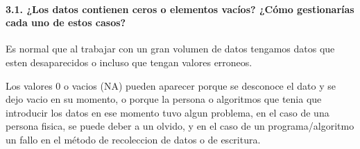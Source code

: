 \documentclass[]{article}
\newenvironment{Shaded}{\begin{snugshade}}{\end{snugshade}}
\newcommand{\DataTypeTok}[1]{\textcolor[rgb]{0.13,0.29,0.53}{#1}}
\newcommand{\DecValTok}[1]{\textcolor[rgb]{0.00,0.00,0.81}{#1}}
\newcommand{\KeywordTok}[1]{\textcolor[rgb]{0.13,0.29,0.53}{\textbf{#1}}}
\newcommand{\NormalTok}[1]{#1}
\newcommand{\OperatorTok}[1]{\textcolor[rgb]{0.81,0.36,0.00}{\textbf{#1}}}
\newcommand{\StringTok}[1]{\textcolor[rgb]{0.31,0.60,0.02}{#1}}
\let\oldparagraph\paragraph
\renewcommand{\paragraph}[1]{\oldparagraph{#1}\mbox{}}
\begin{document}
\begin{Shaded}
\end{Shaded}

\hypertarget{los-datos-contienen-ceros-o-elementos-vacuxedos-cuxf3mo-gestionaruxedas-cada-uno-de-estos-casos}{%
\paragraph{3.1. ¿Los datos contienen ceros o elementos vacíos? ¿Cómo
gestionarías cada uno de estos
casos?}\label{los-datos-contienen-ceros-o-elementos-vacuxedos-cuxf3mo-gestionaruxedas-cada-uno-de-estos-casos}}

Es normal que al trabajar con un gran volumen de datos tengamos datos
que esten desaparecidos o incluso que tengan valores erroneos.

Los valores 0 o vacios (NA) pueden aparecer porque se desconoce el dato
y se dejo vacio en su momento, o porque la persona o algoritmos que
tenia que introducir los datos en ese momento tuvo algun problema, en el
caso de una persona fisica, se puede deber a un olvido, y en el caso de
un programa/algoritmo un fallo en el método de recoleccion de datos o de
escritura.
\end{document}
